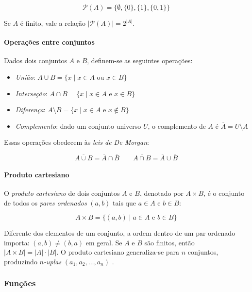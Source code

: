 \documentclass[a4paper,12pt]{article}
\begin{document}
\[
\mathcal{P}(A) = \{\emptyset, \{0\}, \{1\}, \{0,1\}\}
\]

Se $A$ é finito, vale a relação $|\mathcal{P}(A)| = 2^{|A|}$.



\paragraph{Operações entre conjuntos}

Dados dois conjuntos $A$ e $B$, definem-se as seguintes operações:

\begin{itemize}
\item \textit{União}: $A \cup B = \{x \mid x \in A \text{ ou } x \in B\}$
\item \textit{Interseção}: $A \cap B = \{x \mid x \in A \text{ e } x \in B\}$
\item \textit{Diferença}: $A \setminus B = \{x \mid x \in A \text{ e } x \notin B\}$
\item \textit{Complemento}: dado um conjunto universo $U$, o complemento de $A$ é $\overline{A} = U \setminus A$
\end{itemize}

Essas operações obedecem às \textit{leis de De Morgan}:

\[
\overline{A \cup B} = \overline{A} \cap \overline{B} \qquad \overline{A \cap B} = \overline{A} \cup \overline{B}
\]


\paragraph{Produto cartesiano}

O \textit{produto cartesiano} de dois conjuntos $A$ e $B$, denotado por $A \times B$, é o conjunto de todos os \textit{pares ordenados} $(a,b)$ tais que $a \in A$ e $b \in B$:

\[
    A \times B = \{(a,b) \mid a \in A \text{ e } b \in B\}
\]

Diferente dos elementos de um conjunto, a ordem dentro de um par ordenado importa: $(a,b) \neq (b,a)$ em geral. Se $A$ e $B$ são finitos, então $|A \times B| = |A| \cdot |B|$. O produto cartesiano generaliza-se para $n$ conjuntos, produzindo \textit{$n$-uplas} $(a_1, a_2, \dots, a_n)$ \cite{murakami}.



\subsubsection{Funções}
\end{document}
